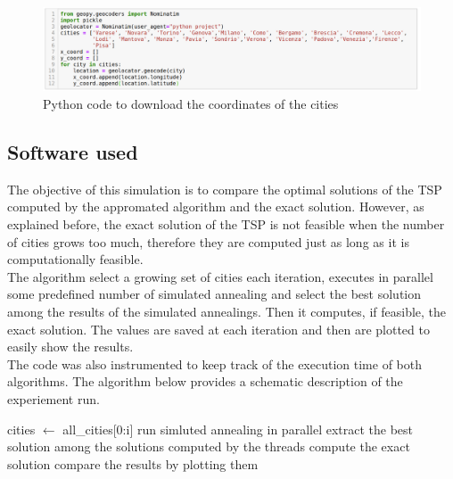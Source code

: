 \documentclass{article}
\begin{document}
\begin{figure}[H]
\includegraphics[scale=0.42]{download_dataset.png} 
\centering
\caption{Python code to download the coordinates of the cities}
\end{figure}

\subsection{Software used}
The objective of this simulation is to compare the optimal solutions of the TSP computed by the appromated algorithm and the exact solution.
However, as explained before, the exact solution of the TSP is not feasible when the number of cities grows too much, therefore they are computed just as long as it is computationally feasible. \\
The algorithm select a growing set of cities each iteration, executes in parallel some predefined number of simulated annealing and select the best solution among the results of the simulated annealings. Then it computes, if feasible, the exact solution. The values are saved at each iteration and then are plotted to easily show the results.\\
The code was also instrumented to keep track of the execution time of both algorithms.
The algorithm  below provides a schematic description of the experiement run. 
\begin{algorithm}[H]
    \begin{algorithmic}[1]
       	\State  cities $\leftarrow$ all\_cities[0:i]
       		\State run simluted annealing in parallel
       	\EndFor 
       	\State extract the best solution among the solutions computed by the threads
       		\State compute the exact solution
       	\EndIf
       	\State compare the results by plotting them
       \EndFor
       \EndFunction
\end{algorithmic}
\end{algorithm}
\end{document}

